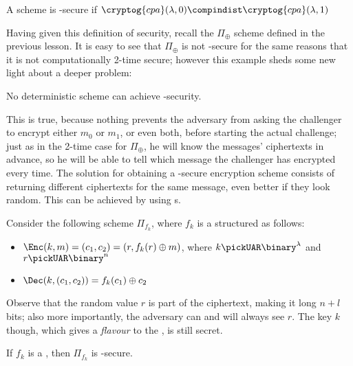 \begin{definition}
    A scheme is \cpa-secure if $\cryptog{cpa}(\lambda, 0) \compindist \cryptog{cpa}(\lambda, 1)$
\end{definition}


Having given this definition of security, recall the $\Pi_\oplus$ scheme defined in the previous lesson. It is easy to see that $\Pi_\oplus$ is not \cpa-secure for the same reasons that it is not computationally 2-time secure; however this example sheds some new light about a deeper problem:

\begin{observation}
    No deterministic scheme can achieve \cpa-security.
\end{observation}

This is true, because nothing prevents the adversary from asking the challenger to encrypt either $m_0$ or $m_1$, or even both, before starting the actual challenge; just as in the 2-time case for $\Pi_\oplus$, he will know the messages' ciphertexts in advance, so he will be able to tell which message the challenger has encrypted every time. The solution for obtaining a \cpa-secure encryption scheme consists of returning different ciphertexts for the same message, even better if they look random. This can be achieved by using \prf{}s.

Consider the following \ske{} scheme $\Pi_{f_k}$, where $f_k$ is a \prf{} structured as follows:

\begin{itemize}
    \item $\Enc(k, m) = (c_1, c_2) = (r, f_k(r) \oplus m)$, where $k \pickUAR \binary^\lambda$ and $r \pickUAR \binary^n$
    
    \item $\Dec(k, (c_1, c_2)) = f_k(c_1) \oplus c_2$
\end{itemize}

Observe that the random value $r$ is part of the ciphertext, making it long $n+l$ bits; also more importantly, the adversary can and will always see $r$. The key $k$ though, which gives a \textit{flavour} to the \prf, is still secret.

\begin{theorem} \label{thm:prfcpa}
    If $f_k$ is a \prf, then $\Pi_{f_k}$ is \cpa-secure.
\end{theorem}

